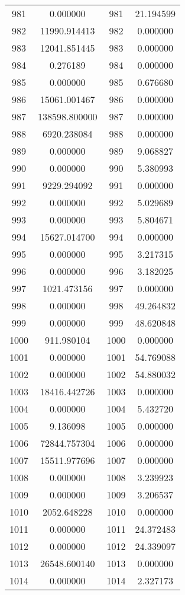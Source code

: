 \documentclass[12pt]{article}
\begin{document}
\begin{longtable}{@{}cccc@{}}
981 & 0.000000 & 981 & 21.194599 \\
982 & 11990.914413 & 982 & 0.000000 \\
983 & 12041.851445 & 983 & 0.000000 \\
984 & 0.276189 & 984 & 0.000000 \\
985 & 0.000000 & 985 & 0.676680 \\
986 & 15061.001467 & 986 & 0.000000 \\
987 & 138598.800000 & 987 & 0.000000 \\
988 & 6920.238084 & 988 & 0.000000 \\
989 & 0.000000 & 989 & 9.068827 \\
990 & 0.000000 & 990 & 5.380993 \\
991 & 9229.294092 & 991 & 0.000000 \\
992 & 0.000000 & 992 & 5.029689 \\
993 & 0.000000 & 993 & 5.804671 \\
994 & 15627.014700 & 994 & 0.000000 \\
995 & 0.000000 & 995 & 3.217315 \\
996 & 0.000000 & 996 & 3.182025 \\
997 & 1021.473156 & 997 & 0.000000 \\
998 & 0.000000 & 998 & 49.264832 \\
999 & 0.000000 & 999 & 48.620848 \\
1000 & 911.980104 & 1000 & 0.000000 \\
1001 & 0.000000 & 1001 & 54.769088 \\
1002 & 0.000000 & 1002 & 54.880032 \\
1003 & 18416.442726 & 1003 & 0.000000 \\
1004 & 0.000000 & 1004 & 5.432720 \\
1005 & 9.136098 & 1005 & 0.000000 \\
1006 & 72844.757304 & 1006 & 0.000000 \\
1007 & 15511.977696 & 1007 & 0.000000 \\
1008 & 0.000000 & 1008 & 3.239923 \\
1009 & 0.000000 & 1009 & 3.206537 \\
1010 & 2052.648228 & 1010 & 0.000000 \\
1011 & 0.000000 & 1011 & 24.372483 \\
1012 & 0.000000 & 1012 & 24.339097 \\
1013 & 26548.600140 & 1013 & 0.000000 \\
1014 & 0.000000 & 1014 & 2.327173 \\

\end{longtable}
\end{document}
